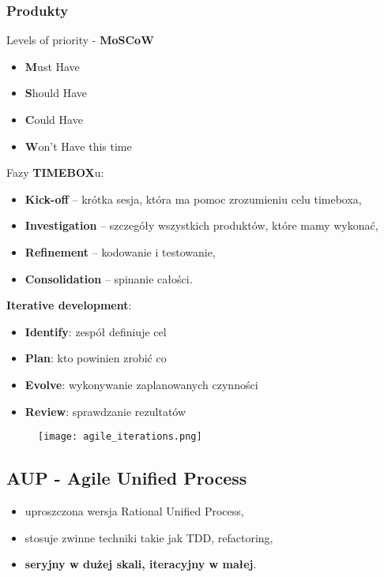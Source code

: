 \documentclass[a4paper]{article}
\begin{document}
    \subsubsection{Produkty}

    Levels of priority - \textbf{MoSCoW}
    \begin{itemize}
        \item \textbf{M}ust Have
        \item \textbf{S}hould Have
        \item \textbf{C}ould Have
        \item \textbf{W}on’t Have this time
    \end{itemize}

    Fazy \textbf{TIMEBOX}u:
    \begin{itemize}
        \item \textbf{Kick-off} – krótka sesja, która ma pomoc zrozumieniu celu timeboxa,
        \item \textbf{Investigation} – szczegóły wszystkich produktów, które mamy wykonać,
        \item \textbf{Refinement} – kodowanie i testowanie,
        \item \textbf{Consolidation} – spinanie całości.
    \end{itemize}

    \textbf{Iterative development}:
    \begin{itemize}
        \item \textbf{Identify}: zespół definiuje cel
        \item \textbf{Plan}: kto powinien zrobić co
        \item \textbf{Evolve}: wykonywanie
        zaplanowanych czynności
        \item \textbf{Review}: sprawdzanie rezultatów
    \end{itemize}


    \begin{figure}[H]
        \texttt{[image: agile\_iterations.png]}
    \end{figure}


    \subsection{AUP - Agile Unified Process}

    \begin{itemize}
        \item uproszczona wersja Rational Unified Process,
        \item stosuje zwinne techniki takie jak TDD, refactoring,
        \item \textbf{seryjny w dużej skali, iteracyjny w małej}.
    \end{itemize}
\end{document}
